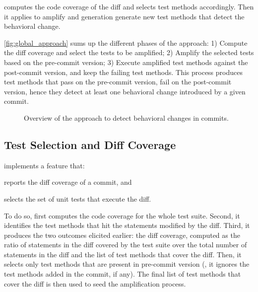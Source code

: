 \DCI computes the code coverage of the diff and selects test methods accordingly. %
Then it applies \dspot to amplify and generation generate new test methods that detect the behavioral change.

\autoref{fig:global_approach} sums up the different phases of the approach:
1) Compute the diff coverage and select the tests to be amplified;
2) Amplify the selected tests based on the pre-commit version;
3) Execute amplified test methods against the post-commit version, and keep the failing test methods.
This process produces test methods that pass on the pre-commit version, fail on the post-commit version, hence they detect at least one behavioral change introduced by a given commit.

\begin{figure}
    \caption{Overview of the approach to detect behavioral changes in commits.}
    \label{fig:global_approach}
\end{figure}

\subsection{Test Selection and Diff Coverage}
\label{subsec:compute_diff_coverage}
\DCI implements a feature that:
\begin{enumerate*}
\item reports the diff coverage of a commit, and
\item selects the set of unit tests that execute the diff.
\end{enumerate*}
%
To do so, \DCI first computes the code coverage for the whole test suite.
Second, it identifies the test methods that hit the statements modified by the diff. 
Third, it produces the two outcomes elicited earlier: the diff coverage, computed as the ratio of statements in the diff covered by the test suite over the total number of statements in the diff and the list of test methods that cover the diff.
%
Then, it selects only test methods that are present in pre-commit version (\ie, it ignores the test methods added in the commit, if any).
The final list of test methods that cover the diff is then used to seed the amplification process.

